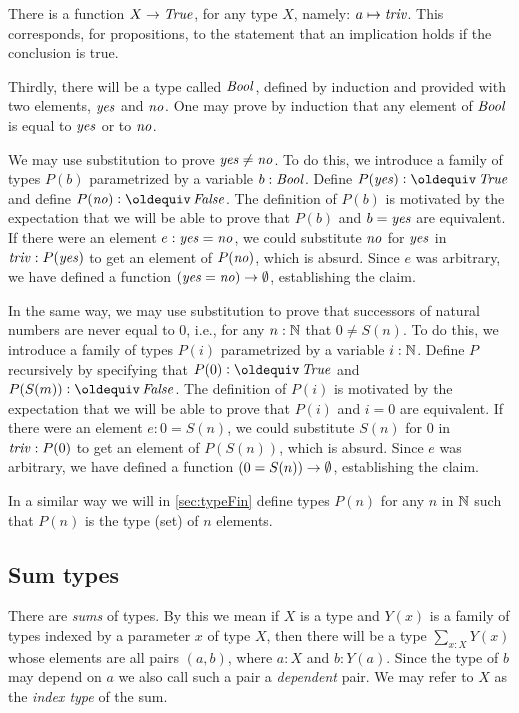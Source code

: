 There is a function $X \to \mathop{\mathit{True}}$, for any type $X$, namely: $a \mapsto \mathop{\mathit{triv}}$.  This corresponds, for propositions, to the statement that an
implication holds if the conclusion is true.

Thirdly, there will be a type called $\mathop{\mathit{Bool}}$, 
defined by induction and provided with two elements, $\mathop{\mathit{yes}}$ and $\mathop{\mathit{no}}$.  
One may prove by induction
that any element of $\mathop{\mathit{Bool}}$ is equal to $\mathop{\mathit{yes}}$ or to $\mathop{\mathit{no}}$.

We may use substitution to prove $\mathop{\mathit{yes}} \ne \mathop{\mathit{no}}$.  To do this, we introduce a family of types $P(b)$ parametrized by a variable $b:\mathop{\mathit{Bool}}$.
Define $P(\yes) \defeq \true$ and define $P(\no) \defeq \false$.  The definition of $P(b)$ is motivated by the expectation that we will be able
to prove that $P(b)$ and $b = \mathop{\mathit{yes}}$ are equivalent.  If there were an element $e: \mathop{\mathit{yes}} = \mathop{\mathit{no}}$, we could substitute $\mathop{\mathit{no}}$ for $\mathop{\mathit{yes}}$ in $\mathop{\mathit{triv}} :
P (\mathop{\mathit{yes}})$ to get an element of $P(\mathop{\mathit{no}})$, which is absurd.  Since $e$ was arbitrary, we have defined a function $(\mathop{\mathit{yes}}=\mathop{\mathit{no}}) \to \emptyset$,
establishing the claim.

In the same way, we may use substitution to prove that successors of natural numbers are never equal to $0$, i.e., for any $n:\mathbb{N}$ that $0 \ne
S(n)$.  To do this, we introduce a family of types $P(i)$ parametrized by a variable $i:\mathbb{N}$.  Define $P$ recursively by specifying that $P(0)
\defeq \true$ and $P(S(m)) \defeq \false$.  The definition of $P(i)$ is motivated by the expectation that we will be able to prove that $P(i)$
and $i = 0$ are equivalent.  If there were an element $e: 0 = S(n)$, we could substitute $S(n)$ for $0$ in $\mathop{\mathit{triv}} : P ( 0 )$ to get an element
of $P(S(n))$, which is absurd.  Since $e$ was arbitrary, we have defined a function $(0=S(n)) \to \emptyset$, establishing the claim.

In a similar way we will in \cref{sec:typeFin} define types $P(n)$ for any $n$ in $\mathbb{N}$
such that $P(n)$ is the type (set) of $n$ elements.

\subsection{Sum types}
\label{sec:sum-types}
There are \emph{sums} of types.  By this we mean if $X$ is a type and $Y(x)$ is a family of types indexed by a parameter $x$ of type $X$, then
there will be a type $\sum _{x:X} Y(x)$ whose elements are all pairs $(a,b)$, where $a:X$ and $b:Y(a)$. Since the type of $b$ may depend on $a$ we also call such a pair
a \emph{dependent} pair. We may refer to $X$ as the \emph{index
  type} of the sum.  

